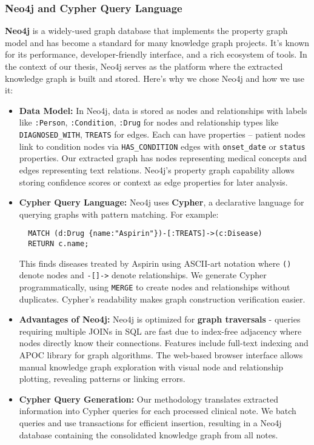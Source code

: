 \subsubsection{Neo4j and Cypher Query Language}

\textbf{Neo4j} \parencite{Neo4j2023} is a widely-used graph database that implements the property graph model and has become a standard for many knowledge graph projects. It's known for its performance, developer-friendly interface, and a rich ecosystem of tools. In the context of our thesis, Neo4j serves as the platform where the extracted knowledge graph is built and stored. Here's why we chose Neo4j and how we use it:

\begin{itemize}
\item \textbf{Data Model:} In Neo4j, data is stored as nodes and relationships with labels like \texttt{\string:Person}, \texttt{\string:Condition}, \texttt{\string:Drug} for nodes and relationship types like \texttt{DIAGNOSED\_WITH}, \texttt{TREATS} for edges. Each can have properties -- patient nodes link to condition nodes via \texttt{HAS\_CONDITION} edges with \texttt{onset\_date} or \texttt{status} properties. Our extracted graph has nodes representing medical concepts and edges representing text relations. Neo4j's property graph capability allows storing confidence scores or context as edge properties for later analysis.

\item \textbf{Cypher Query Language:} Neo4j uses \textbf{Cypher}, a declarative language for querying graphs with pattern matching. For example:
\begin{verbatim}
  MATCH (d:Drug {name:"Aspirin"})-[:TREATS]->(c:Disease)
  RETURN c.name;
\end{verbatim}
This finds diseases treated by Aspirin using ASCII-art notation where \texttt{()} denote nodes and \texttt{-[]->} denote relationships. We generate Cypher programmatically, using \texttt{MERGE} to create nodes and relationships without duplicates. Cypher's readability makes graph construction verification easier.

\item \textbf{Advantages of Neo4j:} Neo4j is optimized for \textbf{graph traversals} - queries requiring multiple JOINs in SQL are fast due to index-free adjacency where nodes directly know their connections. Features include full-text indexing and APOC library for graph algorithms. The web-based browser interface allows manual knowledge graph exploration with visual node and relationship plotting, revealing patterns or linking errors.

\item \textbf{Cypher Query Generation:} Our methodology translates extracted information into Cypher queries for each processed clinical note. We batch queries and use transactions for efficient insertion, resulting in a Neo4j database containing the consolidated knowledge graph from all notes.\end{itemize}

